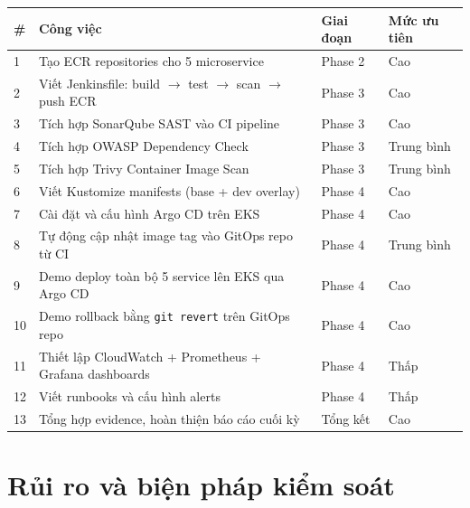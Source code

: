 \documentclass[12pt,a4paper]{article}
\begin{document}
\begin{table}[H]
\centering
\begin{tabular}{@{}p{} p{} p{} p{}@{}}
\toprule
\textbf{\#} & \textbf{Công việc} & \textbf{Giai đoạn} & \textbf{Mức ưu tiên} \\
\midrule
1  & Tạo ECR repositories cho 5 microservice                           & Phase 2 & Cao \\
2  & Viết Jenkinsfile: build $\rightarrow$ test $\rightarrow$ scan $\rightarrow$ push ECR & Phase 3 & Cao \\
3  & Tích hợp SonarQube SAST vào CI pipeline                           & Phase 3 & Cao \\
4  & Tích hợp OWASP Dependency Check                                    & Phase 3 & Trung bình \\
5  & Tích hợp Trivy Container Image Scan                                & Phase 3 & Trung bình \\
6  & Viết Kustomize manifests (base + dev overlay)                      & Phase 4 & Cao \\
7  & Cài đặt và cấu hình Argo CD trên EKS                              & Phase 4 & Cao \\
8  & Tự động cập nhật image tag vào GitOps repo từ CI                   & Phase 4 & Trung bình \\
9  & Demo deploy toàn bộ 5 service lên EKS qua Argo CD                  & Phase 4 & Cao \\
10 & Demo rollback bằng \texttt{git revert} trên GitOps repo             & Phase 4 & Cao \\
11 & Thiết lập CloudWatch + Prometheus + Grafana dashboards             & Phase 4 & Thấp \\
12 & Viết runbooks và cấu hình alerts                                   & Phase 4 & Thấp \\
13 & Tổng hợp evidence, hoàn thiện báo cáo cuối kỳ                      & Tổng kết & Cao \\
\bottomrule
\end{tabular}
\end{table}

\section{Rủi ro và biện pháp kiểm soát}
\end{document}
